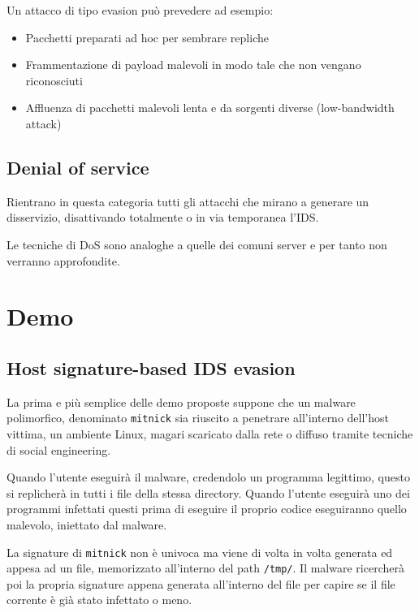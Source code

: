 \documentclass{ldr-article}
\begin{document}
Un attacco di tipo evasion può prevedere ad esempio:

\begin{itemize}
  \item Pacchetti preparati ad hoc per sembrare repliche
  \item Frammentazione di payload malevoli in modo tale che non vengano riconosciuti
  \item Affluenza di pacchetti malevoli lenta e da sorgenti diverse (low-bandwidth attack)
\end{itemize}

\subsection{Denial of service}
Rientrano in questa categoria tutti gli attacchi che mirano a generare un disservizio, disattivando totalmente o in via temporanea l'IDS.

Le tecniche di DoS sono analoghe a quelle dei comuni server e per tanto non verranno approfondite.


\section{Demo}

\subsection{Host signature-based IDS evasion}

La prima e più semplice delle demo proposte suppone che un malware polimorfico, denominato \texttt{mitnick} sia riuscito a penetrare all'interno dell'host vittima, un ambiente Linux, magari scaricato dalla rete o diffuso tramite tecniche di social engineering.

Quando l'utente eseguirà il malware, credendolo un programma legittimo, questo si replicherà in tutti i file della stessa directory. Quando l'utente eseguirà uno dei programmi infettati questi prima di eseguire il proprio codice eseguiranno quello malevolo, iniettato dal malware.

La signature di \texttt{mitnick} non è univoca ma viene di volta in volta generata ed appesa ad un file, memorizzato all'interno del path \texttt{/tmp/}. Il malware ricercherà poi la propria signature appena generata all'interno del file per capire se il file corrente è già stato infettato o meno.
\end{document}
